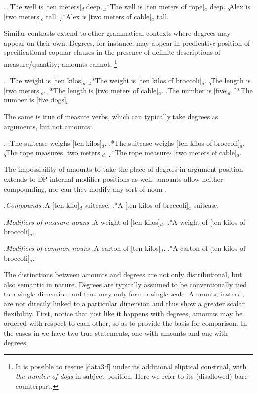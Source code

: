 \documentclass[a4paper,12pt,twoside]{article}
\begin{document}
	\ex.\label{data2}
	\a.\label{data2:a}The well is [ten meters]$_d$ deep.
	\b.*\label{data2:b}The well is [ten meters of rope]$_a$ deep.
	\c.\label{data2:c}Alex is [two meters]$_d$ tall.
	\d.*\label{data2:d}Alex is [two meters of cable]$_a$ tall.
	
	Similar contrasts extend to other grammatical contexts where degrees may appear on their own. Degrees, for instance, may appear in predicative position of specificational copular clauses in the presence of definite descriptions of measure/quantity; amounts cannot.%
	\footnote{
		It is possible to rescue \ref{data3:f} under its additional eliptical construal, with \textit{the number of dogs} in subject position. Here we refer to its (disallowed) bare counterpart.
	}
	
	\ex.\label{data3}
	\a.\label{data3:a}The weight is [ten kilos]$_d$.
	\b.*\label{data3:b}The weight is [ten kilos of broccoli]$_a$.
	\c.\label{data3:c}The length is [two meters]$_d$.
	\d.*\label{data3:d}The length is [two meters of cable]$_a$.
	\e.\label{data3:e}The number is [five]$_d$.
	\f.*\label{data3:f}The number is [five dogs]$_a$.
	
	The same is true of measure verbs, which can typically take degrees as arguments, but not amounts:
	
	\ex.
	\a.The suitcase weighs [ten kilos]$_d$.
	\b.*The suitcase weighs [ten kilos of broccoli]$_a$.
	\c.The rope measures [two meters]$_d$.
	\d.*\label{data4:d}The rope measures [two meters of cable]$_a$.
	
	The impossibility of amounts to take the place of degrees in argument position extends to DP-internal modifier positions as well: amounts allow neither compounding, \Next[a] nor can they modify any sort of noun \Next[b,c].
	
	\ex.\label{data5}\textit{Compounds}
	\a.A [ten kilo]$_d$ suitcase.
	\b.*A [ten kilos of broccoli]$_a$ suitcase.
	
	\ex.\textit{Modifiers of measure nouns}
	\a.A weight of [ten kilos]$_d$.
	\b.*A weight of [ten kilos of broccoli]$_a$.
	
	\ex.\textit{Modifiers of common nouns}
	\a.A carton of [ten kilos]$_d$. 
	\b.*A carton of [ten kilos of broccoli]$_a$.
	
	The distinctions between amounts and degrees are not only distributional, but also semantic in nature. Degrees are typically assumed to be conventionally tied to a single dimension and thus may only form a single scale. Amounts, instead, are not directly linked to a particular  dimension and thus show a greater scalar flexibility. First, notice that just like it happens with degrees, amounts may be ordered with respect to each other, so as to provide the basis for comparison. In the cases in \Next we have two true statements, one with amounts and one with degrees.
	
\end{document}
